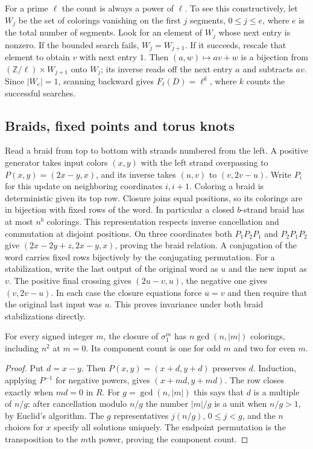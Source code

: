 For a prime $\ell$ the count is always a power of $\ell$. To see this
constructively, let $W_j$ be the set of colorings vanishing on the first
$j$ segments, $0\le j\le e$, where $e$ is the total number of segments.
Look for an element of $W_j$ whose next entry is nonzero. If the bounded
search fails, $W_j=W_{j+1}$. If it succeeds, rescale that element to
obtain $v$ with next entry $1$. Then $(a,w)\mapsto av+w$ is a bijection
from $(\mathbb Z/\ell)\times W_{j+1}$ onto $W_j$; its inverse reads off
the next entry $a$ and subtracts $av$. Since $|W_e|=1$, scanning backward
gives $F_\ell(D)=\ell^k$, where $k$ counts the successful searches.

\subsection{Braids, fixed points and torus knots}

Read a braid from top to bottom with strands numbered from the left.
A positive generator takes input colors $(x,y)$ with the left strand
overpassing to $P(x,y)=(2x-y,x)$, and its inverse takes $(u,v)$ to
$(v,2v-u)$. Write $P_i$ for this update on neighboring coordinates $i,i+1$.
Coloring a braid is deterministic given its top row. Closure joins equal
positions, so its colorings are in bijection with fixed rows of the word.
In particular a closed $b$-strand braid has at most $n^b$ colorings.
This representation respects inverse cancellation and commutation at
disjoint positions. On three coordinates both $P_1P_2P_1$ and $P_2P_1P_2$
give $(2x-2y+z,2x-y,x)$, proving the braid relation. A conjugation of
the word carries fixed rows bijectively by the conjugating permutation.
For a stabilization, write the last output of the original word as $u$
and the new input as $v$. The positive final crossing gives
$(2u-v,u)$, the negative one gives $(v,2v-u)$. In each case the closure
equations force $u=v$ and then require that the original last input was $u$.
This proves invariance under both braid stabilizations directly.

\begin{proposition}
For every signed integer $m$, the closure of $\sigma_1^m$ has
$n\gcd(n,|m|)$ colorings, including $n^2$ at $m=0$. Its component count
is one for odd $m$ and two for even $m$.
\end{proposition}
\begin{proof}
Put $d=x-y$. Then $P(x,y)=(x+d,y+d)$ preserves $d$. Induction, applying
$P^{-1}$ for negative powers, gives $(x+md,y+md)$. The row closes exactly
when $md=0$ in $R$. For $g=\gcd(n,|m|)$ this says that $d$ is a multiple
of $n/g$: after cancellation modulo $n/g$ the number $|m|/g$ is a unit
when $n/g>1$, by Euclid's algorithm. The $g$ representatives
$j(n/g)$, $0\le j<g$, and the $n$ choices for $x$ specify all solutions
uniquely. The endpoint permutation is the transposition to the $m$th
power, proving the component count.
\end{proof}

